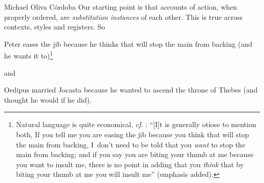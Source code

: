 \begin{artengenv}{Michael Oliva Córdoba}
Our starting point is that accounts of action, when properly ordered, are \textit{substitution instances} of each other. This is true across contexts, styles and registers. So
\vspace{-.07cm}
\begin{description}[font=\normalfont, labelindent=0pt, leftmargin=!, labelwidth=1cm]
  \item[(1)] Peter eases the jib because he thinks that will stop the main from backing (and he wants it to)\footnote{Natural language is quite economical,  \textit{cf.} 
  \parencite[][6f.]{davidson_1963}: %
   ``[I]t is generally otiose to mention both, If you tell me you are easing the jib because you think that will stop the main from backing, I~don't need to be told that you \textit{want} to stop the main from backing; and if you say you are biting your thumb at me because you want to insult me, there is no point in adding that you \textit{think} that by biting your thumb at me you will insult me'' (emphasis added).}
\end{description}

%
% 
\vspace{-.07cm}
\noindent and
\begin{description}[font=\normalfont, labelindent=0pt, leftmargin=!, labelwidth=1cm]
  \item[(2)] Oedipus married Jocasta because he wanted to ascend the throne of Thebes (and thought he would if he did).
\end{description}
%
%


\end{artengenv}
